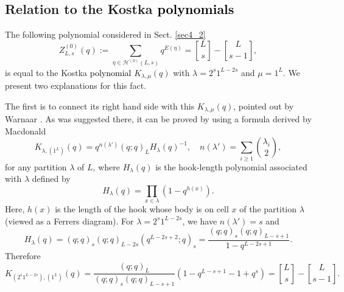\documentclass[sn-mathphys-num]{sn-jnl}%
\newcommand{\red}[1]{\textcolor{black}{#1}}
\theoremstyle{thmstyleone}%
\theoremstyle{thmstyletwo}%
\theoremstyle{thmstylethree}%
\begin{document}
\begin{appendices}

\section{Relation to the Kostka \red{polynomials}}\label{secA}
The following polynomial considered in Sect. \ref{sec4_2}
\begin{equation}\label{eq:2025jun16_3}
Z_{L,s}^{(0)}(q) :=
\sum_{\eta \in \mathcal{H}^{(0)} (L,s)} q^{E(\eta)} ={ L \brack s}- { L \brack s-1},
\end{equation}
is equal to the Kostka \red{polynomial} $K_{\lambda, \mu}(q)$ with
$\lambda =2^s 1^{L-2s}$ and $\mu =1^L$.
We present two explanations for this fact.

The first is to connect its right hand side with this $K_{\lambda, \mu}(q)$,
pointed out by Warnaar \cite{Warnaar2004}.
As was suggested there, it can be proved by using a formula
derived by Macdonald \cite[III. \S 6. Exercise 2]{Macdonald}
\begin{equation*}
K_{\lambda, (1^L)}(q) = q^{n(\lambda')} (q;q)_L H_{\lambda} (q)^{-1}, \quad
n(\lambda') = \sum_{i \geq 1} {\lambda_i \choose 2},
\end{equation*}
for any partition $\lambda$ of $L$, where $H_{\lambda} (q)$ is the hook-length polynomial
associated with $\lambda$ defined by
\begin{equation*}
H_{\lambda} (q) = \prod_{x \in \lambda} (1-q^{h(x)}).
\end{equation*}
Here, $h(x)$ is the length of the hook whose body is on cell $x$ of the partition 
$\lambda$ (viewed as a Ferrers diagram).
For $\lambda =2^s 1^{L-2s}$, we have $n(\lambda') =s$ and
\begin{equation*}
H_{\lambda} (q) =(q;q)_s (q;q)_{L-2s} (q^{L-2s+2};q)_s = \frac{(q;q)_s (q;q)_{L-s+1}}{1-q^{L-2s+1}}.
\end{equation*}
Therefore
\begin{equation*}
K_{(2^s 1^{L-2s}), (1^L)}(q) = \frac{(q;q)_L}{(q;q)_s (q;q)_{L-s+1}}(1-q^{L-s+1}-1+q^s)
={ L \brack s}- { L \brack s-1}.
\end{equation*}


\end{appendices}
\end{document}
